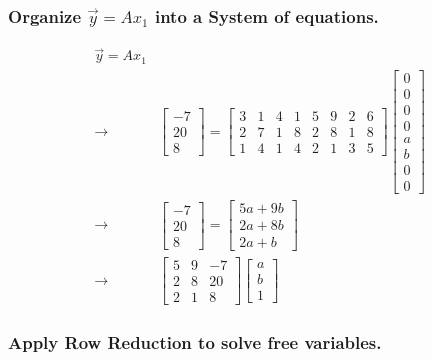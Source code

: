 \documentclass[11pt]{article}
\begin{document}
\subsubsection{Organize \(\vec y = A x_1\) into a System of equations.}
\label{sec:org6d9aacf}
\begin{equation}
\begin{split}
\vec y = A x_1 & \\
\to & \begin{bmatrix} -7\\ 20\\ 8 \end{bmatrix} = \begin{bmatrix} 3 & 1 & 4 & 1 & 5 & 9 & 2 & 6\\ 2 & 7 & 1 & 8 & 2 & 8 &
1 & 8\\ 1 & 4 & 1 & 4 & 2 & 1 & 3 & 5 \end{bmatrix} \begin{bmatrix}
0\\ 0\\ 0\\ 0\\ a\\ b\\ 0\\ 0
\end{bmatrix}\\
\to & \begin{bmatrix}
-7\\ 20\\ 8
\end{bmatrix} = \begin{bmatrix}
5a + 9b\\
2a + 8b\\
2a + b
\end{bmatrix}\\
\to & \begin{bmatrix}
5 & 9 & -7\\
2 & 8 & 20\\
2 & 1 & 8
\end{bmatrix} \begin{bmatrix}
a\\ b\\ 1
\end{bmatrix}
\end{split}
\end{equation}

\subsubsection{Apply Row Reduction to solve free variables.}
\label{sec:orgabe1625}
\end{document}
